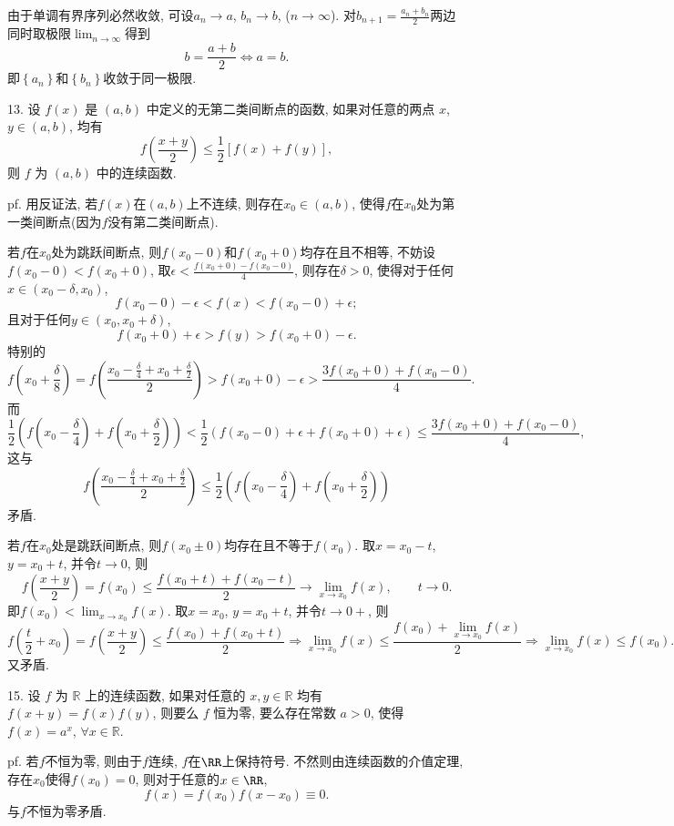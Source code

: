 由于单调有界序列必然收敛, 可设$a_{n}\to a$, $b_{n}\to b$, ($n\to\infty$). 对$b_{n+1}=\frac{a_{n}+b_{n}}{2}$两边同时取极限$\lim_{n\to\infty}$得到
\[
b=\frac{a+b}{2}\Longleftrightarrow a=b.
\]
即$\left\{ a_{n}\right\} $和$\left\{ b_{n}\right\} $收敛于同一极限.

13. 设 $f(x)$ 是 $(a,b)$ 中定义的无第二类间断点的函数, 如果对任意的两点 $x$, $y\in(a,b)$,
均有 
\[
f\left(\frac{x+y}{2}\right)\leqslant\frac{1}{2}[f(x)+f(y)],
\]
则 $f$ 为 $(a,b)$ 中的连续函数.

pf. 用反证法, 若$f(x)$在$(a,b)$上不连续, 则存在$x_{0}\in(a,b)$, 使得$f$在$x_{0}$处为第一类间断点(因为$f$没有第二类间断点).

若$f$在$x_{0}$处为跳跃间断点, 则$f(x_{0}-0)$和$f(x_{0}+0)$均存在且不相等, 不妨设$f(x_{0}-0)<f(x_{0}+0)$,
取$\epsilon<\frac{f(x_{0}+0)-f(x_{0}-0)}{4}$, 则存在$\delta>0$, 使得对于任何$x\in(x_{0}-\delta,x_{0})$,
\[
f(x_{0}-0)-\epsilon<f(x)<f(x_{0}-0)+\epsilon;
\]
且对于任何$y\in(x_{0},x_{0}+\delta)$,
\[
f(x_{0}+0)+\epsilon>f(y)>f(x_{0}+0)-\epsilon.
\]
特别的
\[
f\left(x_{0}+\frac{\delta}{8}\right)=f\left(\frac{x_{0}-\frac{\delta}{4}+x_{0}+\frac{\delta}{2}}{2}\right)>f(x_{0}+0)-\epsilon>\frac{3f(x_{0}+0)+f(x_{0}-0)}{4}.
\]
而
\[
\frac{1}{2}\left(f\left(x_{0}-\frac{\delta}{4}\right)+f\left(x_{0}+\frac{\delta}{2}\right)\right)<\frac{1}{2}\left(f(x_{0}-0)+\epsilon+f(x_{0}+0)+\epsilon\right)\le\frac{3f(x_{0}+0)+f(x_{0}-0)}{4},
\]
这与
\[
f\left(\frac{x_{0}-\frac{\delta}{4}+x_{0}+\frac{\delta}{2}}{2}\right)\le\frac{1}{2}\left(f\left(x_{0}-\frac{\delta}{4}\right)+f\left(x_{0}+\frac{\delta}{2}\right)\right)
\]
矛盾.

若$f$在$x_{0}$处是跳跃间断点, 则$f(x_{0}\pm0)$均存在且不等于$f(x_{0})$. 取$x=x_{0}-t$,
$y=x_{0}+t$, 并令$t\to0$, 则
\[
f\left(\frac{x+y}{2}\right)=f(x_{0})\le\frac{f(x_{0}+t)+f(x_{0}-t)}{2}\to\lim_{x\to x_{0}}f(x),\qquad t\to0.
\]
即$f(x_{0})<\lim_{x\to x_{0}}f(x)$. 取$x=x_{0}$, $y=x_{0}+t$, 并令$t\to0+$,
则
\[
f\left(\frac{t}{2}+x_{0}\right)=f\left(\frac{x+y}{2}\right)\le\frac{f(x_{0})+f(x_{0}+t)}{2}\Longrightarrow\lim_{x\to x_{0}}f(x)\le\frac{f(x_{0})+\lim_{x\to x_{0}}f(x)}{2}\Longrightarrow\lim_{x\to x_{0}}f(x)\le f(x_{0}).
\]
又矛盾.

15. 设 $f$ 为 $\mathbb{R}$ 上的连续函数, 如果对任意的 $x,y\in\mathbb{R}$ 均有 $f(x+y)=f(x)f(y)$,
则要么 $f$ 恒为零, 要么存在常数 $a>0$, 使得 $f(x)=a^{x}$, $\forall x\in\mathbb{R}$.

pf. 若$f$不恒为零, 则由于$f$连续, $f$在$\RR$上保持符号. 不然则由连续函数的介值定理, 存在$x_{0}$使得$f(x_{0})=0$,
则对于任意的$x\in\RR$,
\[
f(x)=f(x_{0})f(x-x_{0})\equiv0.
\]
与$f$不恒为零矛盾.


